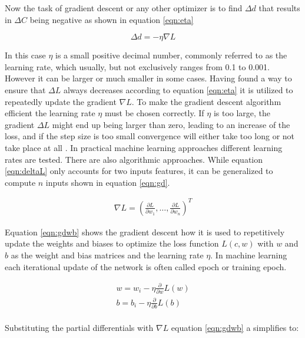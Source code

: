 Now the task of gradient descent or any other optimizer is to find $\Delta d$ that results in $\Delta C$ being negative
as shown in equation \ref{eqn:eta}

\begin{equation}
 \Delta d = -\eta \nabla L
 \label{eqn:eta}
\end{equation}

In this case $\eta$ is a small positive decimal number, commonly referred to as the learning rate, which
usually, but not exclusively ranges from 0.1 to 0.001. However it can be larger or much smaller in some
cases. Having found a way to ensure that $\Delta L$ always decreases according to equation \ref{eqn:eta} it is
utilized to repeatedly update the gradient $\nabla L$. To make the gradient descent algorithm efficient the
learning rate $\eta$ must be chosen correctly. If $\eta$ is too large, the gradient $\Delta L$ might end up
being larger than zero, leading to an increase of the loss, and if the step size is too small convergence will
either take too long or not take place at all \cite{bergstra2011algorithms}. In practical machine learning
approaches different learning rates are tested. There are also algorithmic approaches. While equation
\ref{eqn:deltaL} only accounts for two inputs features, it can be generalized to compute $n$ inputs shown in
equation \ref{eqn:gd}.

\begin{eqnarray}
 \nabla L = \left(\frac{\partial L}{\partial w_1}, \ldots ,
 \frac{\partial L}{\partial w_n}\right)^T
 \label{eqn:gd}
\end{eqnarray}

Equation \ref{eqn:gdwb} shows the gradient descent how it is used to repetitively update the weights and
biases to optimize the loss function $L(c,w)$ with $w$ and $b$ as the weight and bias matrices and the
learning rate $\eta$. In machine learning each iterational update of the network is often called epoch or
training epoch.

\begin{subequations}
 \begin{align}
  w = w_i - \eta \frac{\partial}{\partial w}L(w) \\
  b = b_i - \eta \frac{\partial}{\partial b}L(b) \\
 \end{align}
 \label{eqn:gdwb}
\end{subequations}

Substituting the partial differentials with $\nabla L$ equation \ref{eqn:gdwb} a simplifies to:

